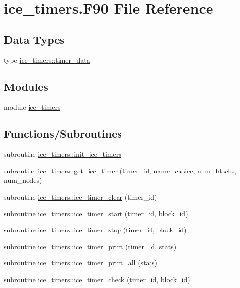 \hypertarget{ice__timers_8F90}{
\section{ice\_\-timers.F90 File Reference}
\label{ice__timers_8F90}
}
\subsection*{Data Types}
\begin{DoxyCompactItemize}
\item 
type \hyperlink{typeice__timers_1_1timer__data}{ice\_\-timers::timer\_\-data}
\end{DoxyCompactItemize}
\subsection*{Modules}
\begin{DoxyCompactItemize}
\item 
module \hyperlink{namespaceice__timers}{ice\_\-timers}
\end{DoxyCompactItemize}
\subsection*{Functions/Subroutines}
\begin{DoxyCompactItemize}
\item 
subroutine \hyperlink{namespaceice__timers_aee6dba44293652055d7e94592a9496da}{ice\_\-timers::init\_\-ice\_\-timers}
\item 
subroutine \hyperlink{namespaceice__timers_ae611f993fd7e53a0106a3ce5bf10c89f}{ice\_\-timers::get\_\-ice\_\-timer} (timer\_\-id, name\_\-choice, num\_\-blocks, num\_\-nodes)
\item 
subroutine \hyperlink{namespaceice__timers_a888b240d9ec89cc7a91d2cb25b59f4e0}{ice\_\-timers::ice\_\-timer\_\-clear} (timer\_\-id)
\item 
subroutine \hyperlink{namespaceice__timers_a308c3af934358cb1f050df7cce19ce79}{ice\_\-timers::ice\_\-timer\_\-start} (timer\_\-id, block\_\-id)
\item 
subroutine \hyperlink{namespaceice__timers_ab483bb3b29e1839baf5a6bc2ad720ca8}{ice\_\-timers::ice\_\-timer\_\-stop} (timer\_\-id, block\_\-id)
\item 
subroutine \hyperlink{namespaceice__timers_a8b8114bad0fd653247cdc104256c83ab}{ice\_\-timers::ice\_\-timer\_\-print} (timer\_\-id, stats)
\item 
subroutine \hyperlink{namespaceice__timers_ace88d185debbc44901eff5a1d54d7fde}{ice\_\-timers::ice\_\-timer\_\-print\_\-all} (stats)
\item 
subroutine \hyperlink{namespaceice__timers_a7e731661ee334413867a1c3c6356c129}{ice\_\-timers::ice\_\-timer\_\-check} (timer\_\-id, block\_\-id)
\end{DoxyCompactItemize}
